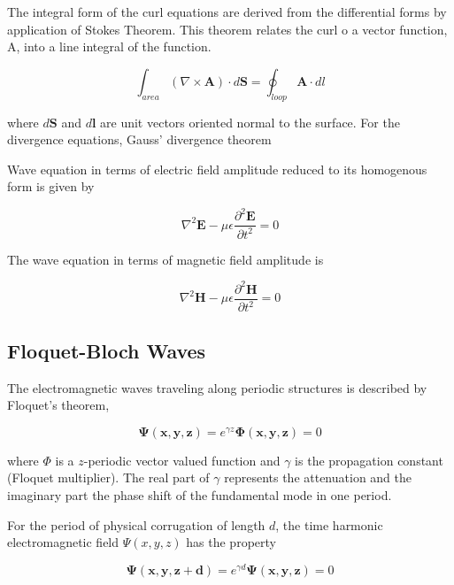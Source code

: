 The integral form of the curl equations are derived from the
differential forms by application of Stokes Theorem. This
theorem relates the curl o a vector function, A, into a line
integral of the function.

\begin{equation}
\int_{area} ( \nabla \times \mathbf{A} ) \cdot d \mathbf{S} = 
\oint_{loop} \mathbf{A} \cdot dl
\end{equation}

where $d \mathbf{S}$ and $d\mathbf{l}$ are unit vectors oriented normal
to the surface. For the divergence equations, Gauss' divergence theorem

Wave equation in terms of electric field amplitude reduced to its
homogenous form is given by

\begin{equation}
\nabla^2 \mathbf{E} - \mu \epsilon \frac{\partial^2 
  \mathbf{E}}{\partial t^2} = 0
\end{equation}

The wave equation in terms of magnetic field amplitude is 

\begin{equation}
\nabla^2 \mathbf{H} - \mu \epsilon \frac{\partial^2 
  \mathbf{H}}{\partial t^2} = 0
\end{equation}

\subsection{Floquet-Bloch Waves}
The electromagnetic waves traveling
along periodic structures is described by Floquet's theorem,

\begin{equation}
\mathbf{\Psi(x,y,z)} = e^{\gamma z} \mathbf{\Phi(x,y,z)} = 0
\label{defD0}
\end{equation}

where $\Phi$ is a $z$-periodic vector valued function and $\gamma$ is
the propagation constant (Floquet multiplier). The real part of
$\gamma$ represents the attenuation and the imaginary part the phase
shift of the fundamental mode in one period.

For the period of physical corrugation of length $d$, the time
harmonic electromagnetic field $\Psi(x,y,z)$ has the property

\begin{equation}
\mathbf{\Psi(x,y,z + d)} = e^{\gamma d} \mathbf{\Psi(x,y,z)} = 0
\label{defD1}
\end{equation}


